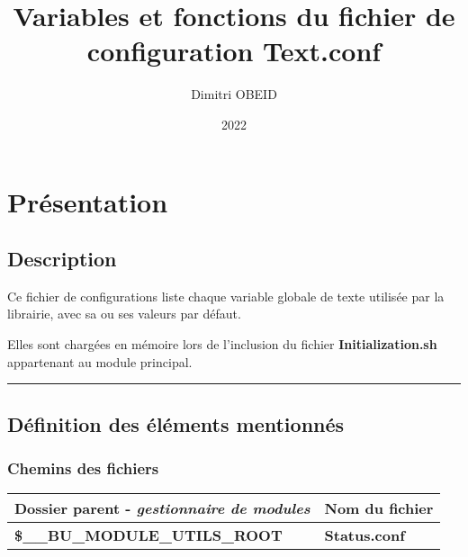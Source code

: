 \documentclass[a4paper,10pt]{article}
\title{\color{sec1}Variables et fonctions du fichier de configuration \color{path}Text.conf}\color{text}
\author{Dimitri OBEID}
\date{2022}
\begin{document}
\maketitle
\newpage

\hypertarget{contents}{}
\tableofcontents
\newpage

\color{sec1}
\section{Présentation}\color{text}

\color{sec2}
\subsection{Description}\color{text}

\begin{justify}
    Ce fichier de configurations liste chaque variable globale de texte utilisée par la librairie, avec sa ou ses valeurs par défaut.
\end{justify}

\begin{justify}
    Elles sont chargées en mémoire lors de l'inclusion du fichier \textbf{\color{path}Initialization.sh} appartenant au module principal.
\end{justify}



\color{sec2}\par\noindent\rule{\textwidth}{0.4pt}\color{text}

\color{sec2}
\subsection{Définition des éléments mentionnés}\color{text}

\color{sec3}
\subsubsection{Chemins des fichiers}\color{text}

\begin{justify}
    \begin{tabular}{|l|l|}
        \hline
        \textbf{Dossier parent} - \textit{gestionnaire de modules} & \textbf{Nom du fichier}\\
        \hline
        \textbf{\color{vars}\$\_\_BU\_MODULE\_UTILS\_ROOT} & \textbf{\color{path}Status.conf}\\
        \hline
    \end{tabular}
\end{justify}
\end{document}

